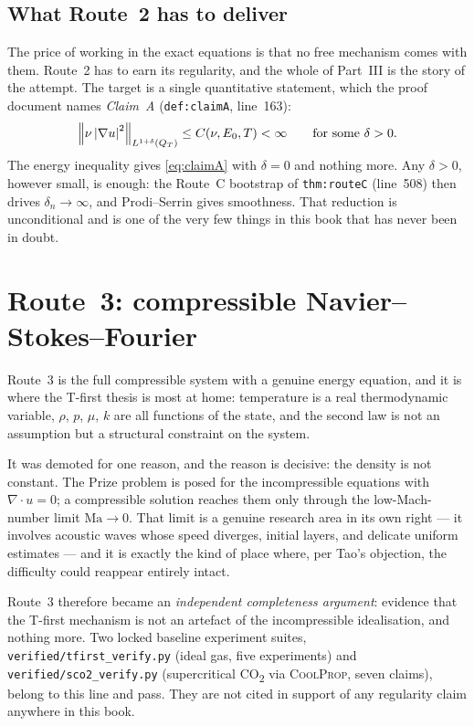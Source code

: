 \subsection{What Route~2 has to deliver}

The price of working in the exact equations is that no free mechanism comes
with them. Route~2 has to earn its regularity, and the whole of Part~III is
the story of the attempt. The target is a single quantitative statement, which
the proof document names \emph{Claim~A} (\texttt{def:claimA}, line~163):
\begin{equation}\label{eq:claimA}
  \left\|\nu\left|\nabla u\right|^2\right\|_{L^{1+\delta}(Q_T)} \le C(\nu,E_0,T)<\infty
  \qquad\text{for some }\delta>0 .
\end{equation}
The energy inequality gives \eqref{eq:claimA} with \(\delta=0\) and nothing
more. Any \(\delta>0\), however small, is enough: the Route~C bootstrap of
\texttt{thm:routeC} (line~508) then drives \(\delta_n\to\infty\), and
Prodi--Serrin gives smoothness. That reduction is unconditional and is one of
the very few things in this book that has never been in doubt.

\section{Route~3: compressible Navier--Stokes--Fourier}
\label{sec:route3}

Route~3 is the full compressible system with a genuine energy equation, and
it is where the T-first thesis is most at home: temperature is a real
thermodynamic variable, \(\rho\), \(p\), \(\mu\), \(k\) are all functions of
the state, and the second law is not an assumption but a structural
constraint on the system.

It was demoted for one reason, and the reason is decisive: the density is not
constant. The Prize problem is posed for the incompressible equations with
\(\nabla\cdot u=0\); a compressible solution reaches them only through the
low-Mach-number limit \(\mathrm{Ma}\to0\). That limit is a genuine research
area in its own right --- it involves acoustic waves whose speed diverges,
initial layers, and delicate uniform estimates --- and it is exactly the kind
of place where, per Tao's objection, the difficulty could reappear entirely
intact.

Route~3 therefore became an \emph{independent completeness argument}: evidence
that the T-first mechanism is not an artefact of the incompressible
idealisation, and nothing more. Two locked baseline experiment suites,
\texttt{verified/tfirst\_verify.py} (ideal gas, five experiments) and
\texttt{verified/sco2\_verify.py} (supercritical CO\textsubscript{2} via
\textsc{CoolProp}, seven claims), belong to this line and pass. They are not
cited in support of any regularity claim anywhere in this book.

